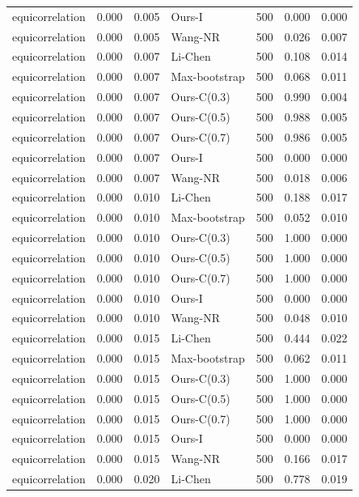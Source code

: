 \begin{tabular}{lrrlrrr}
equicorrelation & 0.000 & 0.005 & Ours-I & 500 & 0.000 & 0.000 \\
equicorrelation & 0.000 & 0.005 & Wang-NR & 500 & 0.026 & 0.007 \\
equicorrelation & 0.000 & 0.007 & Li-Chen & 500 & 0.108 & 0.014 \\
equicorrelation & 0.000 & 0.007 & Max-bootstrap & 500 & 0.068 & 0.011 \\
equicorrelation & 0.000 & 0.007 & Ours-C(0.3) & 500 & 0.990 & 0.004 \\
equicorrelation & 0.000 & 0.007 & Ours-C(0.5) & 500 & 0.988 & 0.005 \\
equicorrelation & 0.000 & 0.007 & Ours-C(0.7) & 500 & 0.986 & 0.005 \\
equicorrelation & 0.000 & 0.007 & Ours-I & 500 & 0.000 & 0.000 \\
equicorrelation & 0.000 & 0.007 & Wang-NR & 500 & 0.018 & 0.006 \\
equicorrelation & 0.000 & 0.010 & Li-Chen & 500 & 0.188 & 0.017 \\
equicorrelation & 0.000 & 0.010 & Max-bootstrap & 500 & 0.052 & 0.010 \\
equicorrelation & 0.000 & 0.010 & Ours-C(0.3) & 500 & 1.000 & 0.000 \\
equicorrelation & 0.000 & 0.010 & Ours-C(0.5) & 500 & 1.000 & 0.000 \\
equicorrelation & 0.000 & 0.010 & Ours-C(0.7) & 500 & 1.000 & 0.000 \\
equicorrelation & 0.000 & 0.010 & Ours-I & 500 & 0.000 & 0.000 \\
equicorrelation & 0.000 & 0.010 & Wang-NR & 500 & 0.048 & 0.010 \\
equicorrelation & 0.000 & 0.015 & Li-Chen & 500 & 0.444 & 0.022 \\
equicorrelation & 0.000 & 0.015 & Max-bootstrap & 500 & 0.062 & 0.011 \\
equicorrelation & 0.000 & 0.015 & Ours-C(0.3) & 500 & 1.000 & 0.000 \\
equicorrelation & 0.000 & 0.015 & Ours-C(0.5) & 500 & 1.000 & 0.000 \\
equicorrelation & 0.000 & 0.015 & Ours-C(0.7) & 500 & 1.000 & 0.000 \\
equicorrelation & 0.000 & 0.015 & Ours-I & 500 & 0.000 & 0.000 \\
equicorrelation & 0.000 & 0.015 & Wang-NR & 500 & 0.166 & 0.017 \\
equicorrelation & 0.000 & 0.020 & Li-Chen & 500 & 0.778 & 0.019 \\

\end{tabular}
